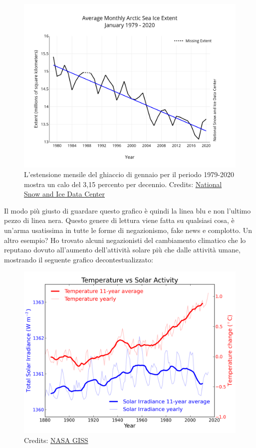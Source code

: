 \documentclass[12pt]{book} %
\begin{document}
\begin{figure}[H]
  \centering
  \includegraphics[width=0.95\linewidth]{images/Libro-img021.png}
  \caption{L'estensione mensile del ghiaccio di gennaio per il
periodo 1979-2020 mostra un calo del 3,15 percento per decennio. Credits: \href{https://nsidc.org/arcticseaicenews/2020/02/}{National Snow and Ice Data Center}}
\end{figure}

Il modo più giusto di guardare questo grafico è quindi la linea blu e non l'ultimo pezzo di linea
nera. Questo genere di lettura viene fatta su qualsiasi cosa, è un'arma usatissima in tutte le
forme di negazionismo, fake news e complotto. Un altro esempio? Ho trovato alcuni negazionisti del cambiamento
climatico che lo reputano dovuto all'aumento dell'attività solare più che
dalle attività umane, mostrando il seguente grafico decontestualizzato:

\begin{figure}[H]
  \centering
  \includegraphics[width=0.95\linewidth]{images/Libro-img022.png}
  \caption{Credits: \href{http://data.giss.nasa.gov/gistemp/tabledata/GLB.Ts+dSST.txt}{NASA GISS}}
\end{figure}
\end{document}
